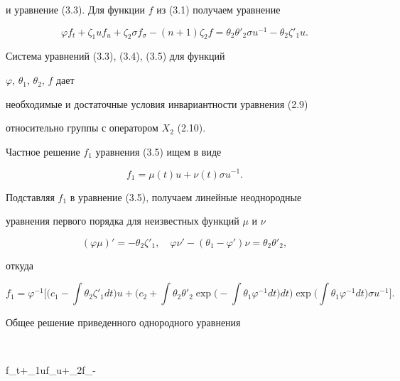 и уравнение (3.3). Для функции $f$ из (3.1) получаем уравнение


\begin{equation}


\varphi f_t+\zeta_1 uf_u+\zeta_2\sigma f_\sigma


-(n+1)\zeta_2f=\theta_2\theta'_2 \sigma u^{-1}


-\theta_2\zeta'_1u. \tag{3.5}


\end{equation}


Система уравнений (3.3), (3.4), (3.5) для функций


$\varphi$, $\theta_1$, $\theta_2$, $f$ дает


необходимые и достаточные условия инвариантности уравнения (2.9)


относительно группы с оператором $X_2$ (2.10).





Частное решение $f_1$ уравнения (3.5) ищем в виде


$$


f_1=\mu(t)u+\nu(t)\sigma u^{-1}.


$$


Подставляя $f_1$ в уравнение (3.5), получаем линейные неоднородные


уравнения первого порядка для неизвестных функций $\mu$ и $\nu$


$$


(\varphi\mu)'=-\theta_2\zeta'_1,\quad


\varphi\nu'-(\theta_1-\varphi')\nu=\theta_2\theta'_2,


$$


откуда


\begin{equation}


f_1=\varphi^{-1}\biggl[\biggl(c_1-\int \theta_2\zeta'_1dt\biggr)u


+\biggl(c_2+\int \theta_2\theta'_2\exp\biggl(-\int \theta_1


\varphi^{-1}dt\biggr)dt\biggr)\exp\biggl(\int \theta_1


\varphi^{-1}dt\biggr)\sigma u^{-1}\biggr].\tag{3.6}


\end{equation}


Общее решение приведенного однородного уравнения


$$


\varphi f_t+\zeta_1uf_u+\zeta_2\sigma f_\sigma-


